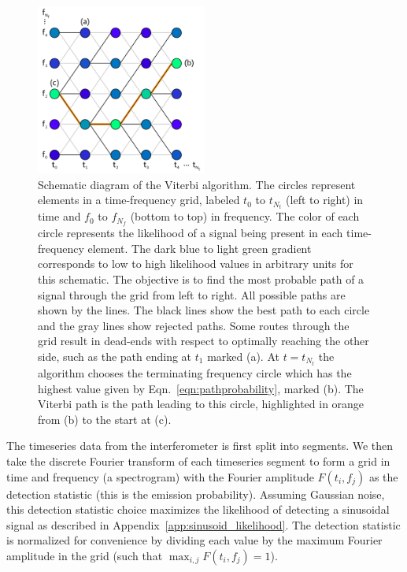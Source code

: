 \documentclass[paper-main.tex]{subfiles}
\begin{document}
\begin{figure}
\includegraphics[width=0.5\textwidth]{figures/viterbiDiagramBlue.pdf}
\caption{\label{fig:viterbi}
Schematic diagram of the Viterbi algorithm. 
The circles represent elements in a time-frequency grid, labeled $t_0$ to $t_{N_t}$ (left to right) in time and $f_0$ to $f_{N_f}$ (bottom to top) in frequency. 
The color of each circle represents the likelihood of a signal being present in each time-frequency element.
The dark blue to light green gradient corresponds to low to high likelihood values in arbitrary units for this schematic. 
The objective is to find the most probable path of a signal through the grid from left to right.
All possible paths are shown by the lines. 
The black lines show the best path to each circle and the gray lines show rejected paths. 
Some routes through the grid result in dead-ends with respect to optimally reaching the other side, such as the path ending at $t_1$ marked (a).
At $t=t_{N_t}$ the algorithm chooses the terminating frequency circle which has the highest value given by Eqn.~\ref{eqn:pathprobability}, marked (b). 
The Viterbi path is the path leading to this circle, highlighted in orange from (b) to the start at (c). 
}
\end{figure}













The timeseries data from the interferometer is first split into segments. 
We then take the discrete Fourier transform of each timeseries segment to form a grid in time and frequency (a spectrogram) with the Fourier amplitude $F(t_i,f_j)$ as the detection statistic (this is the emission probability).
Assuming Gaussian noise, this detection statistic choice maximizes the likelihood of detecting a sinusoidal signal as described in Appendix~\ref{app:sinusoid_likelihood}.
The detection statistic is normalized for convenience by dividing each value by the maximum Fourier amplitude in the grid (such that $\max_{i,j} F(t_i,f_j) = 1$).
\end{document}
